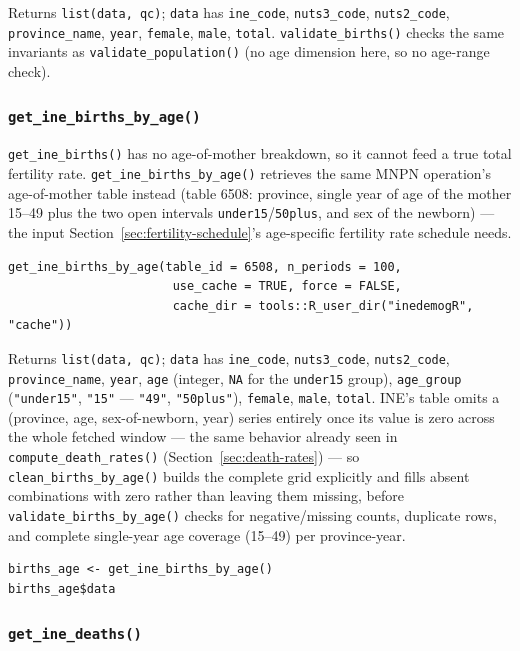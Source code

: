 \documentclass[11pt]{article}
\newcommand{\fn}[1]{\texttt{#1}}
\begin{document}
Returns \fn{list(data, qc)}; \fn{data} has \fn{ine\_code}, \fn{nuts3\_code},
\fn{nuts2\_code}, \fn{province\_name}, \fn{year}, \fn{female}, \fn{male},
\fn{total}. \fn{validate\_births()} checks the same invariants as
\fn{validate\_population()} (no age dimension here, so no age-range check).

\subsubsection{\fn{get\_ine\_births\_by\_age()}}
\label{sec:births-by-age}

\fn{get\_ine\_births()} has no age-of-mother breakdown, so it cannot feed a
true total fertility rate. \fn{get\_ine\_births\_by\_age()} retrieves the
same MNPN operation's age-of-mother table instead (table 6508: province,
single year of age of the mother 15--49 plus the two open intervals
\fn{under15}/\fn{50plus}, and sex of the newborn) --- the input
Section~\ref{sec:fertility-schedule}'s age-specific fertility rate schedule
needs.

\begin{lstlisting}
get_ine_births_by_age(table_id = 6508, n_periods = 100,
                       use_cache = TRUE, force = FALSE,
                       cache_dir = tools::R_user_dir("inedemogR", "cache"))
\end{lstlisting}

Returns \fn{list(data, qc)}; \fn{data} has \fn{ine\_code}, \fn{nuts3\_code},
\fn{nuts2\_code}, \fn{province\_name}, \fn{year}, \fn{age} (integer, \fn{NA}
for the \fn{under15} group), \fn{age\_group} (\fn{"under15"}, \fn{"15"} ---
\fn{"49"}, \fn{"50plus"}), \fn{female}, \fn{male}, \fn{total}. INE's table
omits a (province, age, sex-of-newborn, year) series entirely once its
value is zero across the whole fetched window --- the same behavior already
seen in \fn{compute\_death\_rates()} (Section~\ref{sec:death-rates}) --- so
\fn{clean\_births\_by\_age()} builds the complete grid explicitly and fills
absent combinations with zero rather than leaving them missing, before
\fn{validate\_births\_by\_age()} checks for negative/missing counts,
duplicate rows, and complete single-year age coverage (15--49) per
province-year.

\begin{lstlisting}
births_age <- get_ine_births_by_age()
births_age$data
\end{lstlisting}

\subsubsection{\fn{get\_ine\_deaths()}}
\end{document}
